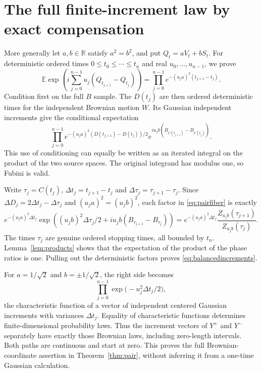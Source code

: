 \documentclass[11pt]{article}
\newcommand{\E}{\mathbb E}
\newcommand{\R}{\mathbb R}
\begin{document}
\section{The full finite-increment law by exact compensation}
More generally let $a,b\in\R$ satisfy $a^2=b^2$, and put
$Q_t=aV_t+bS_t$. For deterministic ordered times
$0\leq t_0\leq\cdots\leq t_n$ and real $u_0,\ldots,u_{n-1}$,
we prove
\begin{equation}\label{eq:balancedincrements}
 \E\exp\left(i\sum_{j=0}^{n-1}u_j(Q_{t_{j+1}}-Q_{t_j})\right)
 =\prod_{j=0}^{n-1}e^{-(u_ja)^2(t_{j+1}-t_j)}.
\end{equation}
Condition first on the full $B$ sample. The $D(t_j)$ are then
ordered deterministic times for the independent Brownian motion $W$.
Its Gaussian independent increments give the conditional expectation
\begin{equation}\label{eq:pairfiber}
 \prod_{j=0}^{n-1}
 e^{-(u_ja)^2(D(t_{j+1})-D(t_j))/2}
 e^{iu_jb(B_{C(t_{j+1})}-B_{C(t_j)})}.
\end{equation}
This use of conditioning can equally be written as an iterated
integral on the product of the two source spaces. The original
integrand has modulus one, so Fubini is valid.

Write $\tau_j=C(t_j)$, $\Delta t_j=t_{j+1}-t_j$ and
$\Delta\tau_j=\tau_{j+1}-\tau_j$. Since
$\Delta D_j=2\Delta t_j-\Delta\tau_j$ and
$(u_ja)^2=(u_jb)^2$, each factor in \eqref{eq:pairfiber} is exactly
\begin{equation}\label{eq:exactcompensation}
 e^{-(u_ja)^2\Delta t_j}
 \exp\left((u_jb)^2\Delta\tau_j/2+
             iu_jb(B_{\tau_{j+1}}-B_{\tau_j})\right)
 =e^{-(u_ja)^2\Delta t_j}
  \frac{Z_{u_jb}(\tau_{j+1})}{Z_{u_jb}(\tau_j)}.
\end{equation}
The times $\tau_j$ are genuine ordered stopping times, all bounded
by $t_n$. Lemma~\ref{lem:products} shows that the expectation of
the product of the phase ratios is one. Pulling out the deterministic
factors proves \eqref{eq:balancedincrements}.

For $a=1/\sqrt2$ and $b=\pm1/\sqrt2$, the right side becomes
\[
 \prod_{j=0}^{n-1}\exp\bigl(-u_j^2\Delta t_j/2\bigr),
\]
the characteristic function of a vector of independent centered
Gaussian increments with variances $\Delta t_j$. Equality of
characteristic functions determines finite-dimensional probability
laws. Thus the increment vectors of $Y^+$ and $Y^-$ separately
have exactly those Brownian laws, including zero-length intervals.
Both paths are continuous and start at zero. This proves the full
Brownian-coordinate assertion in Theorem~\ref{thm:pair}, without
inferring it from a one-time Gaussian calculation.
\end{document}
